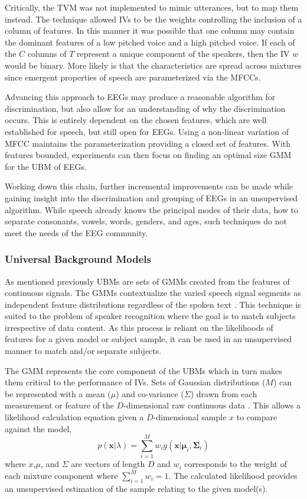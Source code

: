 Critically, the \ac{TVM} was not implemented to mimic utterances, but to map them instead. The technique allowed \acp{IV} to be the weights controlling the inclusion of a column of features. In this manner it was possible that one column may contain the dominant features of a low pitched voice and a high pitched voice. If each of the $C$ columns of $T$ represent a unique component of the speakers, then the \ac{IV} $w$ would be binary. More likely is that the characteristics are spread across mixtures since emergent properties of speech are parameterized via the \acp{MFCC}.

Advancing this approach to \acp{EEG} may produce a reasonable algorithm for discrimination, but also allow for an understanding of why the discrimination occurs. This is entirely dependent on the chosen features, which are well established for speech, but still open for \acp{EEG}. Using a non-linear variation of \ac{MFCC} maintains the parameterization providing a closed set of features. With features bounded, experiments can then focus on finding an optimal size \ac{GMM} for the \ac{UBM} of \acp{EEG}.

Working down this chain, further incremental improvements can be made while gaining insight into the discrimination and grouping of \acp{EEG} in an unsupervised algorithm. While speech already knows the principal modes of their data, how to separate consonants, vowels, words, genders, and ages, such techniques do not meet the needs of the \ac{EEG} community.

\subsubsection{Universal Background Models}

As mentioned previously \acp{UBM} are sets of \acp{GMM} created from the features of continuous signals. The \acp{GMM} contextualize the varied speech signal segments as independent feature distributions regardless of the spoken text \cite{Reynolds2000}. This technique is suited to the problem of speaker recognition where the goal is to match subjects irrespective of data content. As this process is reliant on the likelihoods of features for a given model or subject sample, it can be used in an unsupervised manner to match and/or separate subjects.

The \ac{GMM} represents the core component of the \acp{UBM} which in turn makes them critical to the performance of \acp{IV}. Sets of Gaussian distributions ($M$) can be represented with a mean ($\mu$) and co-variance ($\Sigma$) drawn from each measurement or feature of the $D$-dimensional raw continuous data \cite{Reynolds2009}. This allows a likelihood calculation equation given a $D$-dimensional sample $x$ to compare against the model,
\begin{equation}
p(\bm{x}|\lambda) = \sum_{i=1}^{M}w_{i}g(\bm{x}|\bm{\mu}_{i},\bm{\Sigma}_{i})
\end{equation}
where $x$,$\mu$, and $\Sigma$ are vectors of length $D$ and $w_{i}$ corresponds to the weight of each mixture component where $\sum_{i=1}^{M}w_{i}=1$. The calculated likelihood provides an unsupervised estimation of the sample relating to the given model(s).

